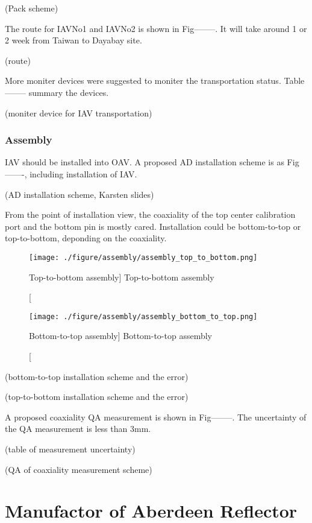 (Pack scheme)


The route for IAVNo1 and IAVNo2 is shown in Fig--------.
It will take around 1 or 2 week from Taiwan to Dayabay site.


(route)


More moniter devices were suggested to moniter the transportation
status. Table-------- summary the devices.


(moniter device for IAV transportation)


\subsubsection {Assembly}
\label {sec:assembly}

IAV should be installed into OAV. A proposed AD installation
scheme is as Fig-------, including installation of IAV.


(AD installation scheme, Karsten slides)


From the point of installation view, the coaxiality of the top center calibration port and
the bottom pin is mostly cared. Installation could be bottom-to-top or top-to-bottom, deponding
on the coaxiality.







\begin{figure}
    \centering
    \texttt{[image: ./figure/assembly/assembly\_top\_to\_bottom.png]}
    \caption
    [Top-to-bottom assembly]
    {Top-to-bottom assembly}
    \label{fig:assembly_top_to_bottom.png}
    \end{figure}


\begin{figure}
    \centering
    \texttt{[image: ./figure/assembly/assembly\_bottom\_to\_top.png]}
    \caption
    [Bottom-to-top assembly]
    {Bottom-to-top assembly}
    \label{fig:assembly_bottom_to_top.png}
    \end{figure}









(bottom-to-top installation scheme and the error)




(top-to-bottom installation scheme and the error)



A proposed coaxiality QA measurement is shown in Fig--------. The uncertainty
of the QA measurement is less than 3mm.


(table of measurement uncertainty)





(QA of coaxiality measurement scheme)







\section {Manufactor of Aberdeen Reflector}
\label{sec:reflector}
